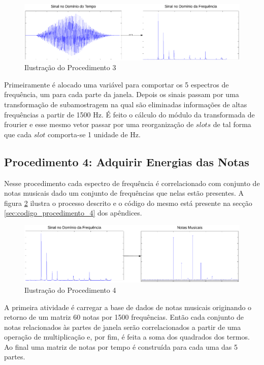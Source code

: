 \begin{figure}[h] 
  \centering
    \includegraphics[keepaspectratio=true, scale=0.5]{figuras/procedimento_3}
    \caption{Ilustração do Procedimento 3}
    \label{fig:procedimento_3}
\end{figure}

Primeiramente é alocado uma variável para comportar os 5 espectros de frequência, um para cada parte da janela. Depois os sinais passam por uma transformação de subamostragem na qual são eliminadas informações de altas frequências a partir de 1500 Hz. É feito o cálculo do módulo da transformada de frourier e esse mesmo vetor passar por uma reorganização de $slots$ de tal forma que cada $slot$ comporta-se 1 unidade de Hz.

\subsection{Procedimento 4: Adquirir Energias das Notas}
\label{subsec:procedimento_4}

Nesse procedimento cada espectro de frequência é correlacionado com conjunto de notas musicais dado um conjunto de frequências que nelas estão presentes. A figura \ref{fig:procedimento_4} ilustra o processo descrito e o código do mesmo está presente na secção \ref{sec:codigo_procedimento_4} dos apêndices.

\begin{figure}[h] 
  \centering
    \includegraphics[keepaspectratio=true, scale=0.55]{figuras/procedimento_4}
    \caption{Ilustração do Procedimento 4}
    \label{fig:procedimento_4}
\end{figure}

A primeira atividade é carregar a base de dados de notas musicais originando o retorno de um matriz 60 notas por 1500 frequências. Então cada conjunto de notas relacionados às partes de janela serão correlacionados a partir de uma operação de multiplicação e, por fim, é feita a soma dos quadrados dos termos. Ao final uma matriz de notas por tempo é construída para cada uma das 5 partes.

